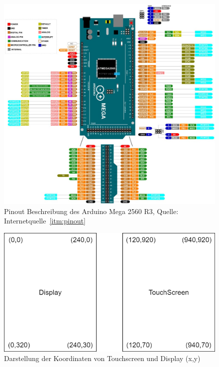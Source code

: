 \documentclass[a4paper, 11pt]{scrartcl}
\begin{document}
\begin{small}
\begin{figure}[H]
    \begin{center}
        \includegraphics[scale=2.5]{Bilder/Arduino-Mega-Pinout.jpg}
        \caption{Pinout Beschreibung des Arduino Mega 2560 R3, Quelle: Internetquelle~\ref{itm:pinout}}\label{diag:pinout}
    \end{center}
\end{figure}

\begin{figure}[H]
    \begin{center}
        \includegraphics[scale=0.5]{Bilder/touch_grafik_koord.png}
        \caption{Darstellung der Koordinaten von Touchscreen und Display (x,y)}\label{diag:diskrepanz}
    \end{center}
\end{figure}




\end{small}
\end{document}
